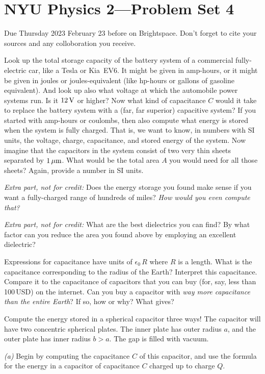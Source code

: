 \documentclass[12pt]{article}
\begin{document}
\section*{NYU Physics 2---Problem Set 4}

Due Thursday 2023 February 23 before on Brightspace.
Don't forget to cite your sources and any colloboration you receive.

\startproblem
Look up the total storage capacity of the battery system of a
commercial fully-electric car, like a Tesla or Kia~EV6. It might
be given in amp-hours, or it might be given in joules or
joules-equivalent (like hp-hours or gallons of gasoline
equivalent). And look up also what voltage at which the automobile
power systems run. Is it $12\,\mathrm{V}$ or higher? Now what kind of
capacitance $C$ would it take to replace the battery system with a
(far, far superior) capacitive system? If you started with amp-hours
or coulombs, then also compute what energy is stored when the system
is fully charged. That is, we want to know, in numbers with SI units, the voltage,
charge, capacitance, and stored energy of the system. Now imagine that
the capacitors in the system consist of two very thin sheets separated
by $1\,\mathrm{\mu m}$.  What would be the total area $A$ you would need for all
those sheets? Again, provide a number in SI units.

\emph{Extra part, not for credit:} Does the energy storage you found
make sense if you want a fully-charged range of hundreds of miles? \emph{How
would you even compute that?}

\emph{Extra part, not for credit:} What are the best dielectrics you can find?
By what factor can you reduce the area you found above by employing an excellent
dielectric?

\startproblem
Expressions for capacitance have units of $\epsilon_0\,R$ where $R$ is a length.
What is the capacitance corresponding to the radius of the Earth?
Interpret this capacitance.
Compare it to the capacitance of capacitors that you can buy (for,
say, less than 100\,USD) on the internet.
Can you buy a capacitor with \emph{way more capacitance than the entire
  Earth}?
If so, how or why? What gives?

\startproblem
Compute the energy stored in a spherical capacitor three ways!
The capacitor will have two concentric spherical plates.
The inner plate has outer radius $a$, and the outer plate has
inner radius $b>a$.
The gap is filled with vacuum.

\textsl{(a)}
Begin by computing the capacitance $C$ of this capacitor, and
use the formula for the energy in a capacitor of capacitance $C$
charged up to charge $Q$.
\end{document}
